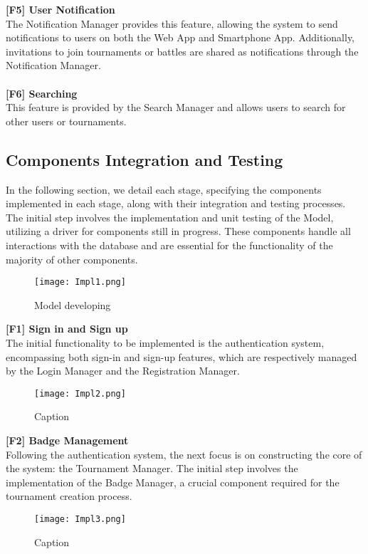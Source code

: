 \documentclass{article}
\begin{document}
\textbf{[F5] User Notification} \\
The Notification Manager provides this feature, allowing the system to send notifications to users on both the Web App and Smartphone App. Additionally, invitations to join tournaments or battles are shared as notifications through the Notification Manager. \\\\
\textbf{[F6] Searching} \\
This feature is provided by the Search Manager and allows users to search for other users or tournaments.
\newpage
\subsection{Components Integration and Testing}
In the following section, we detail each stage, specifying the components implemented in each stage, along with their integration and testing processes. The initial step involves the implementation and unit testing of the Model, utilizing a driver for components still in progress. These components handle all interactions with the database and are essential for the functionality of the majority of other components.

\begin{figure}[H]
    \centering
    \texttt{[image: Impl1.png]}
    \caption{Model developing}
\end{figure}
\newpage
\noindent
\textbf{[F1] Sign in and Sign up} \\
The initial functionality to be implemented is the authentication system, encompassing both sign-in and sign-up features, which are respectively managed by the Login Manager and the Registration Manager.

\begin{figure}[H]
    \centering
    \texttt{[image: Impl2.png]}
    \caption{Caption}
\end{figure}

\newpage
\noindent
\textbf{[F2] Badge Management} \\
Following the authentication system, the next focus is on constructing the core of the system: the Tournament Manager. The initial step involves the implementation of the Badge Manager, a crucial component required for the tournament creation process.
\begin{figure}[H]
    \centering
    \texttt{[image: Impl3.png]}
    \caption{Caption}
\end{figure}
\end{document}
